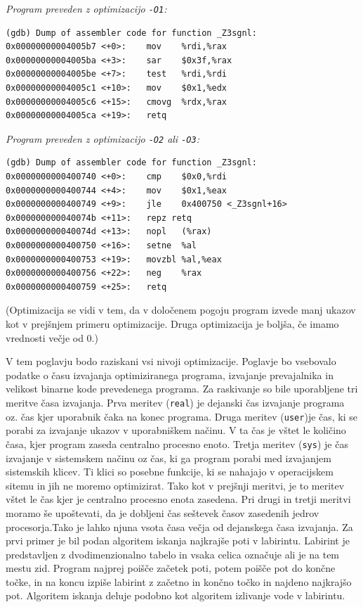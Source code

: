 \documentclass[a4paper, 12pt]{book}
\begin{document}
\noindent
{\it Program preveden z optimizacijo \texttt{-O1}:}
\begin{Verbatim}[baselinestretch=1]
(gdb) Dump of assembler code for function _Z3sgnl:
0x00000000004005b7 <+0>: 	mov    %rdi,%rax
0x00000000004005ba <+3>: 	sar    $0x3f,%rax
0x00000000004005be <+7>: 	test   %rdi,%rdi
0x00000000004005c1 <+10>:	mov    $0x1,%edx
0x00000000004005c6 <+15>:	cmovg  %rdx,%rax
0x00000000004005ca <+19>:	retq
\end{Verbatim}

\medskip

\noindent
{\it Program preveden z optimizacijo \texttt{-O2} ali \texttt{-O3}:}
\begin{Verbatim}[baselinestretch=1]
(gdb) Dump of assembler code for function _Z3sgnl:
0x0000000000400740 <+0>: 	cmp    $0x0,%rdi
0x0000000000400744 <+4>: 	mov    $0x1,%eax
0x0000000000400749 <+9>: 	jle    0x400750 <_Z3sgnl+16>
0x000000000040074b <+11>:	repz retq 
0x000000000040074d <+13>:	nopl   (%rax)
0x0000000000400750 <+16>:	setne  %al
0x0000000000400753 <+19>:	movzbl %al,%eax
0x0000000000400756 <+22>:	neg    %rax
0x0000000000400759 <+25>:	retq
\end{Verbatim}
	\noindent
	{\small (Optimizacija se vidi v tem, da v določenem pogoju program izvede manj ukazov kot v prejšnjem primeru optimizacije. Druga optimizacija je boljša, če imamo vrednosti večje od 0.)}
	
V tem poglavju bodo raziskani vsi nivoji optimizacije. Poglavje bo vsebovalo podatke o času izvajanja optimiziranega programa, izvajanje prevajalnika in velikost binarne kode prevedenega programa. Za raskivanje so bile uporabljene tri meritve časa izvajanja. Prva meritev (\texttt{real}) je dejanski čas izvajanje programa oz. čas kjer uporabnik čaka na konec programa. Druga meritev (\texttt{user})je čas, ki se porabi za izvajanje ukazov v uporabniškem načinu. V ta čas je vštet le količino časa, kjer program zaseda centralno procesno enoto. Tretja meritev (\texttt{sys}) je čas izvajanje v sistemskem načinu oz čas, ki ga program porabi med izvajanjem sistemskih klicev. Ti klici so posebne funkcije, ki se nahajajo v operacijskem sitemu in jih ne moremo optimizirat. Tako kot v prejšnji meritvi, je to meritev vštet le čas kjer je centralno procesno enota zasedena. Pri drugi in tretji meritvi moramo še upoštevati, da je dobljeni čas seštevek časov zasedenih jedrov procesorja.Tako je lahko njuna vsota časa večja od dejanskega časa izvajanja. Za prvi primer je bil podan algoritem iskanja najkrajše poti v labirintu. Labirint je predstavljen z dvodimenzionalno tabelo in vsaka celica označuje ali je na tem mestu zid. Program najprej poišče začetek poti, potem poišče pot do končne točke, in na koncu izpiše labirint z začetno in končno točko in najdeno najkrajšo pot. Algoritem iskanja deluje podobno kot algoritem izlivanje vode v labirintu.
\medskip
\end{document}
